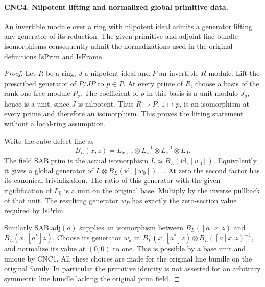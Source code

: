 \paragraph{CNC4. Nilpotent lifting and normalized global primitive data.}
\label{claim:CNC4}
An invertible module over a ring with nilpotent ideal admits a generator
lifting any generator of its reduction.  The given primitive and adjoint
line-bundle isomorphisms consequently admit the normalizations used in
the original definitions \(\mathrm{IsPrim}\) and \(\mathrm{IsFrame}\).
\begin{proof}
Let \(R\) be a ring, \(J\) a nilpotent ideal and \(P\) an invertible
\(R\)-module.  Lift the prescribed generator of \(P/JP\) to \(p\in P\).
At every prime of \(R\), choose a basis of the rank-one free module
\(P_\mathfrak p\).  The coefficient of \(p\) in this basis is a
unit modulo \(J_\mathfrak p\), hence is a unit, since \(J\) is
nilpotent.  Thus \(R\to P\), \(1\mapsto p\), is an isomorphism
at every prime and therefore an isomorphism.  This proves the lifting
statement without a local-ring assumption.

Write the cube-defect line as
\[
 B_L(x,z)=L_{x+z}\otimes L_x^{-1}\otimes L_z^{-1}\otimes L_0.
                                                               \tag{CNC.5}
\]
The field \(\mathrm{SAB}.\mathrm{prim}\) is the actual isomorphism
\(L\simeq B_L(\mathrm{id},[w_0])\).  Equivalently it gives a
global generator of
\(L\otimes B_L(\mathrm{id},[w_0])^{-1}\).
At zero the second factor has its canonical trivialization.  The ratio
of this generator with the given rigidification of \(L_0\) is a
unit on the original base.  Multiply by the inverse pullback of that
unit.  The resulting generator \(w_P\) has exactly the zero-section
value required by \(\mathrm{IsPrim}\).

Similarly \(\mathrm{SAB}.\mathrm{adj}(a)\) supplies an isomorphism
between \(B_L([a]x,z)\) and \(B_L(x,[a^*]z)\).  Choose its
generator \(w_a\) in
\(B_L(x,[a^*]z)\otimes B_L([a]x,z)^{-1}\), and normalize its
value at \((0,0)\) to one.  This is possible by a base unit and
unique by CNC1.  All these choices are made for the original line
bundle on the original family.  In particular the primitive identity
is not asserted for an arbitrary symmetric line bundle lacking the
original \(\mathrm{prim}\) field.
\end{proof}

